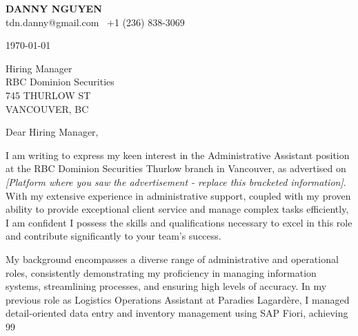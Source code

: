 \documentclass[letterpaper,11pt]{article}
\begin{document}
\textbf{DANNY NGUYEN} \\
tdn.danny@gmail.com \textbullet\ +1 (236) 838-3069 \\
\vspace{20pt}

\today \\
\vspace{20pt}

Hiring Manager \\
RBC Dominion Securities \\
745 THURLOW ST \\
VANCOUVER, BC \\
\vspace{20pt}

Dear Hiring Manager, \\
\vspace{10pt}

I am writing to express my keen interest in the Administrative Assistant position at the RBC Dominion Securities Thurlow branch in Vancouver, as advertised on \textit{[Platform where you saw the advertisement -  replace this bracketed information]}.  With my extensive experience in administrative support, coupled with my proven ability to provide exceptional client service and manage complex tasks efficiently, I am confident I possess the skills and qualifications necessary to excel in this role and contribute significantly to your team's success.

\vspace{10pt}

My background encompasses a diverse range of administrative and operational roles, consistently demonstrating my proficiency in managing information systems, streamlining processes, and ensuring high levels of accuracy.  In my previous role as Logistics Operations Assistant at Paradies Lagardère, I managed detail-oriented data entry and inventory management using SAP Fiori, achieving 99%

\vspace{10pt}
\end{document}

